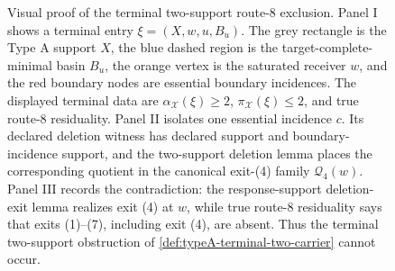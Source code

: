 \documentclass[11pt]{article}
\begin{document}
\begin{figure}[t]
{%
}
\caption[Visual proof of the terminal two-support route-8 exclusion]{Visual proof of the terminal two-support route-8 exclusion.  Panel I shows a terminal entry \(\xi=(X,w,u,B_u)\).  The grey rectangle is the Type A support \(X\), the blue dashed region is the target-complete-minimal basin \(B_u\), the orange vertex is the saturated receiver \(w\), and the red boundary nodes are essential boundary incidences.  The displayed terminal data are \(\alpha_{\mathcal X}(\xi)\ge2\), \(\pi_{\mathcal X}(\xi)\le2\), and true route-8 residuality.  Panel II isolates one essential incidence \(c\).  Its declared deletion witness has declared support and boundary-incidence support, and the two-support deletion lemma places the corresponding quotient in the canonical exit-(4) family \(\mathcal Q_4(w)\).  Panel III records the contradiction: the response-support deletion-exit lemma realizes exit (4) at \(w\), while true route-8 residuality says that exits (1)--(7), including exit (4), are absent.  Thus the terminal two-support obstruction of \cref{def:typeA-terminal-two-carrier} cannot occur.}
\label{fig:typeA-terminal-route8-nogo-gadget}
\end{figure}
\end{document}
